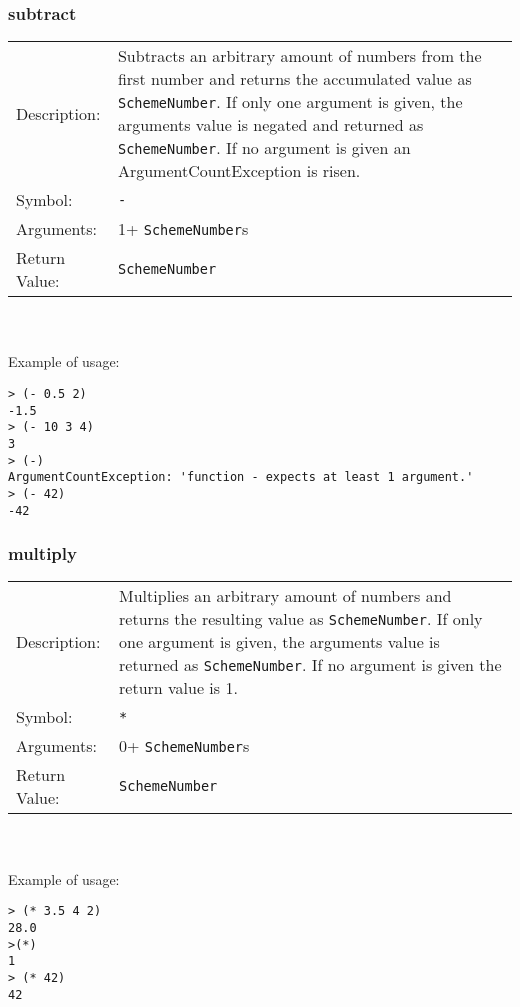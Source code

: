 \documentclass[12pt,a4paper]{scrartcl}
\begin{document}
\subsubsection{subtract}
\begin{tabular}{l  p{13cm}}
Description: & Subtracts an arbitrary amount of numbers from the first number and returns the accumulated value as \lstinline{SchemeNumber}. If only one argument is given, the arguments value is negated and returned as \lstinline{SchemeNumber}. If no argument is given an ArgumentCountException is risen.\\
Symbol: & \lstinline{-}\\
Arguments: & 1+ \lstinline{SchemeNumber}s\\
Return Value: & \lstinline{SchemeNumber}
\end{tabular}
\\
\\
Example of usage:
\begin{lstlisting}
> (- 0.5 2)
-1.5
> (- 10 3 4)
3
> (-)
ArgumentCountException: 'function - expects at least 1 argument.'
> (- 42)
-42
\end{lstlisting}

\subsubsection{multiply}
\begin{tabular}{l  p{13cm}}
Description: & Multiplies an arbitrary amount of numbers and returns the resulting value as \lstinline{SchemeNumber}. If only one argument is given, the arguments value is returned as \lstinline{SchemeNumber}. If no argument is given the return value is 1.\\
Symbol: & \lstinline{*}\\
Arguments: & 0+ \lstinline{SchemeNumber}s\\
Return Value: & \lstinline{SchemeNumber}
\end{tabular}
\\
\\
Example of usage:
\begin{lstlisting}
> (* 3.5 4 2)
28.0
>(*)
1
> (* 42)
42
\end{lstlisting}
\end{document}
